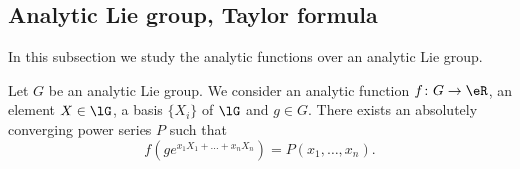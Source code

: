 \subsection{Analytic Lie group, Taylor formula}

In this subsection we study the analytic functions over an analytic Lie group.

\begin{lemma}     \label{LEMooPILVooHQbtAH}
    Let \( G\) be an analytic Lie group. We consider an analytic function \( f\colon G\to \eR\), an element \( X\in \lG\), a basis \( \{ X_i \}\) of \( \lG\) and \( g\in G\). There exists an absolutely converging power series \( P\) such that
    \begin{equation}
        f(g e^{x_1X_1+\ldots +x_nX_n})=P(x_1,\ldots, x_n).
    \end{equation}
\end{lemma}

